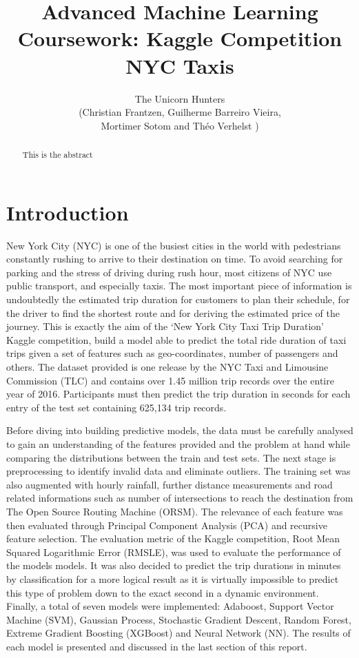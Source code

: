 \documentclass[a4paper]{article}
\author{The Unicorn Hunters\\
(Christian Frantzen, Guilherme Barreiro Vieira,\\
Mortimer Sotom and Théo Verhelst )}
\title{Advanced Machine Learning Coursework: Kaggle Competition NYC Taxis}
\begin{document}
\maketitle


\begin{abstract}
This is the abstract
\end{abstract}

\section{Introduction}
New York City (NYC) is one of the busiest cities in the world with pedestrians
constantly rushing to arrive to their destination on time. To avoid searching
for parking and the stress of driving during rush hour, most citizens of NYC use
public transport, and especially taxis. The most important piece of information
is undoubtedly the estimated trip duration for customers to plan their schedule,
for the driver to find the shortest route and for deriving the estimated price
of the journey. This is exactly the aim of the ‘New York City Taxi Trip
Duration’ Kaggle competition, build a model able to predict the total ride
duration of taxi trips given a set of features such as geo-coordinates, number
of passengers and others. The dataset provided is one release by the NYC Taxi
and Limousine Commission (TLC) and contains over 1.45 million trip records over
the entire year of 2016. Participants must then predict the trip duration in
seconds for each entry of the test set containing 625,134 trip records.

Before diving into building predictive models, the data must be carefully
analysed to gain an understanding of the features provided and the problem at
hand while comparing the distributions between the train and test sets. The next
stage is preprocessing to identify invalid data and eliminate outliers. The
training set was also augmented with hourly rainfall, further distance
measurements and road related informations such as number of intersections to
reach the destination from The Open Source Routing Machine (ORSM). The relevance
of each feature was then evaluated through Principal Component Analysis (PCA)
and recursive feature selection. The evaluation metric of the Kaggle
competition, Root Mean Squared Logarithmic Error (RMSLE), was used to evaluate
the performance of the models models. It was also decided to predict the trip
durations in minutes by classification for a more logical result as it is
virtually impossible to predict this type of problem down to the exact second in
a dynamic environment. Finally, a total of seven models were implemented:
Adaboost, Support Vector Machine (SVM), Gaussian Process, Stochastic Gradient
Descent, Random Forest, Extreme Gradient Boosting (XGBoost) and Neural Network
(NN). The results of each model is presented and discussed in the last section
of this report.
\end{document}
